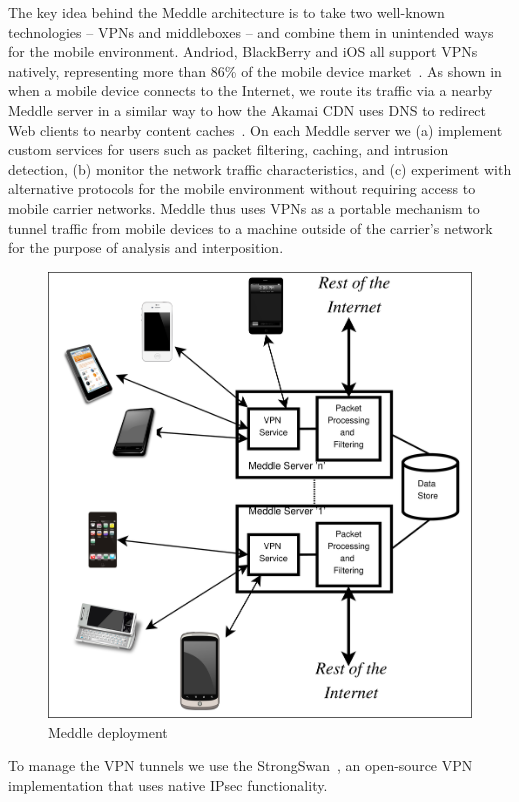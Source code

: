 \documentclass{sig-alternate-10pt}
\newcommand{\meddle}{{Meddle}\xspace}
\renewcommand{\fref}{\Fref}
\begin{document}
The key idea behind the \meddle architecture is to take two well-known
technologies -- VPNs and middleboxes -- and combine them in unintended
ways for the mobile environment. Andriod, BlackBerry and iOS all
support VPNs natively, representing more than 86\% of the mobile
device market~\cite{gartner-phone-share}. As shown in
\fref{fig:MeddleDeployment} when a mobile device connects to the
Internet, we route its traffic via a nearby \meddle server in a
similar way to how the Akamai CDN uses DNS to redirect Web clients to
nearby content caches~\cite{akamai:cdn}. On each \meddle server we (a)
implement custom services for users such as packet filtering, caching,
and intrusion detection, (b) monitor the network traffic
characteristics, and (c) experiment with alternative protocols for the
mobile environment without requiring access to mobile carrier
networks. \meddle thus uses VPNs as a portable mechanism to tunnel 
traffic from mobile devices to a machine outside of the carrier's
network for the purpose of analysis and interposition.

\begin{figure}
  \centering
  \includegraphics[width=0.6\columnwidth]{figures/meddle-servers.pdf}
  \caption{Meddle deployment}
  \label{fig:MeddleDeployment}
\end{figure}

To manage the VPN tunnels we use the StrongSwan~\cite{strongswan}, an
open-source VPN implementation that uses native IPsec functionality.

\end{document}
